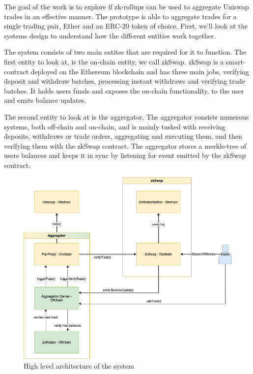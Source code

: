 \documentclass[../../thesis.tex]{subfiles}
\begin{document}
The goal of the work is to explore if zk-rollups can be used to aggregate Uniswap trades in an effective manner. The prototype is able to aggregate trades for a single trading pair, Ether and an ERC-20 token of choice. First, we'll look at the systems design to understand how the different entities work together.


The system consists of two main entites that are required for it to function. The first entity to look at, is the on-chain entity, we call zkSwap. zkSwap is a smart-contract deployed on the Ethereum blockchain and has three main jobs, verifying deposit and withdraw batches, processing instant withdraws and verifying trade batches. It holds users funds and exposes the on-chain functionality, to the user and emits balance updates. 

The second entity to look at is the aggregator. The aggregator consists numerous systems, both off-chain and on-chain, and is mainly tasked with receiving deposits, withdraws or trade orders, aggregating and executing them, and then verifying them with the zkSwap contract. The aggregator stores a merkle-tree of users balances and keeps it in sync by listening for event emitted by the zkSwap contract.

\begin{figure}[h]
    \centerline{\includegraphics[totalheight=8cm]{diagrams/architecture.png}}
    \caption{High level architecture of the system}
    \label{fig:architecture}
\end{figure}
\end{document}
